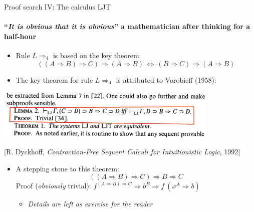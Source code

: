 \documentclass[english]{beamer}
\begin{document}
\begin{frame}{Proof search IV: The calculus LJT}


\framesubtitle{``\emph{It is obvious that it is obvious}'' \textendash{} a mathematician
after thinking for a half-hour}
\begin{itemize}
\item Rule $L\Rightarrow_{4}$ is based on the key theorem: {\footnotesize{}
\[
\left(\left(A\Rightarrow B\right)\Rightarrow C\right)\Rightarrow\left(A\Rightarrow B\right)\,\Longleftrightarrow\,\left(B\Rightarrow C\right)\Rightarrow\left(A\Rightarrow B\right)
\]
}{\footnotesize \par}
\item The key theorem for rule $L\Rightarrow_{4}$ is attributed to Vorobieff
(1958):
\end{itemize}
\begin{center}
\includegraphics[width=0.8\textwidth]{Vorobieff-lemma}
\par\end{center}

\begin{center}
{\footnotesize{}{[}R. Dyckhoff, }\emph{\footnotesize{}Contraction-Free
Sequent Calculi for Intuitionistic Logic}{\footnotesize{}, 1992{]}}
\par\end{center}{\footnotesize \par}
\begin{itemize}
\item A stepping stone to this theorem:{\footnotesize{}
\[
\left(\left(A\Rightarrow B\right)\Rightarrow C\right)\Rightarrow B\Rightarrow C
\]
}Proof (\emph{obviously} trivial): $f^{\left(A\Rightarrow B\right)\Rightarrow C}\Rightarrow b^{B}\Rightarrow f\:(x^{A}\Rightarrow b)$
\begin{itemize}
\item \emph{Details are left as exercise for the reader}
\end{itemize}
\end{itemize}
\end{frame}
\end{document}
